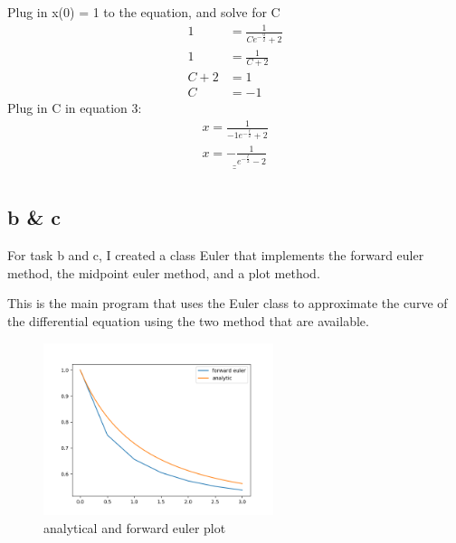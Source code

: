 \documentclass{article}
\begin{document}
Plug in x(0) = 1 to the equation, and solve for C
\begin{equation}
    \begin{split}
        1 &= \frac{1}{Ce^{-\frac{0}{2}} + 2} \\
        1 &= \frac{1}{C + 2} \\
        C + 2 &= 1 \\
        C &= -1
    \end{split}
\end{equation}
Plug in C in equation 3:
\begin{equation}
    \begin{split}
        x = \frac{1}{-1e^{-\frac{t}{2}} + 2} \\
        \underline{\underline{x = -\frac{1}{e^{-\frac{t}{2}} - 2}}} \\
    \end{split}
\end{equation}

\newpage

\subsection*{b \& c}



For task b and c, I created a class Euler that implements the forward euler method, the midpoint euler method,
and a plot method.

\newpage



This is the main program that uses the Euler class to approximate the curve of the differential equation using
the two method that are available.

\newpage

\begin{figure}[h]
    \centering
    \includegraphics[width=0.6\textwidth]{task_2b}
    \caption{analytical and forward euler plot}
\end{figure}
\end{document}

